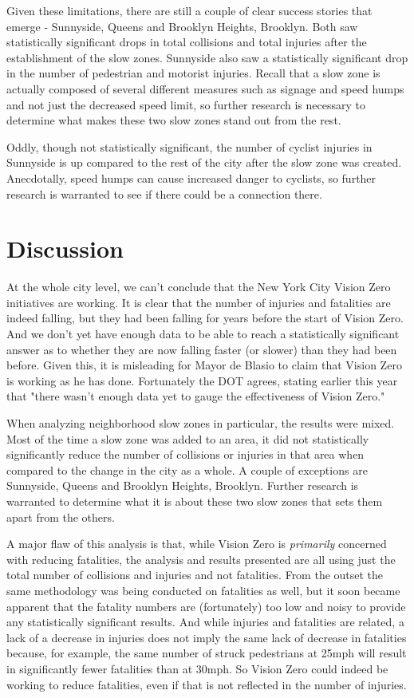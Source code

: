 \documentclass[10pt,journal,compsoc]{IEEEtran}
\begin{document}
Given these limitations, there are still a couple of clear success stories that emerge - Sunnyside, Queens and Brooklyn Heights, Brooklyn.  Both saw statistically significant drops in total collisions and total injuries after the establishment of the slow zones.  Sunnyside also saw a statistically significant drop in the number of pedestrian and motorist injuries.  Recall that a slow zone is actually composed of several different measures such as signage and speed humps and not just the decreased speed limit, so further research is necessary to determine what makes these two slow zones stand out from the rest.

Oddly, though not statistically significant, the number of cyclist injuries in Sunnyside is up compared to the rest of the city after the slow zone  was created.  Anecdotally, speed humps can cause increased danger to cyclists, so further research is warranted to see if there could be a connection there. 

\section{Discussion}
At the whole city level, we can't conclude that the New York City Vision Zero initiatives are working.  It is clear that the number of injuries and fatalities are indeed falling, but they had been falling for years before the start of Vision Zero.  And we don't yet have enough data to be able to reach a statistically significant answer as to whether they are now falling faster (or slower) than they had been before.  Given this, it is misleading for Mayor de Blasio to claim that Vision Zero is working as he has done.  Fortunately the DOT agrees, stating earlier this year that "there wasn't enough data yet to gauge the effectiveness of Vision Zero." \cite{news}

When analyzing neighborhood slow zones in particular, the results were mixed.  Most of the time a slow zone  was added to an area, it did not statistically significantly reduce the number of collisions or injuries in that area when compared to the change in the city as a whole.  A couple of exceptions are Sunnyside, Queens and Brooklyn Heights, Brooklyn. Further research is warranted to determine what it is about these two slow zones that sets them apart from the others.

A major flaw of this analysis is that, while Vision Zero is \textit{primarily} concerned with reducing fatalities, the analysis and results presented are all using just the total number of collisions and injuries and not fatalities.  From the outset the same methodology was being conducted on fatalities as well, but it soon became apparent that the fatality numbers are (fortunately) too low and noisy to provide any statistically significant results.  And while injuries and fatalities are related, a lack of a decrease in injuries does not imply the same lack of decrease in fatalities because, for example, the same number of struck pedestrians at 25mph will result in significantly fewer fatalities than at 30mph. So Vision Zero could indeed  be working to reduce fatalities, even if that is not reflected in the number of injuries.
\end{document}
